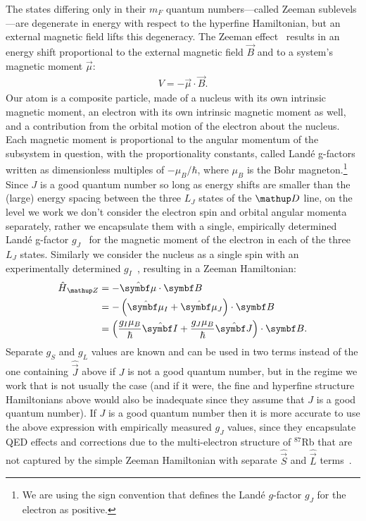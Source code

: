 The states differing only in their $m_F$ quantum numbers---called Zeeman sublevels---are degenerate in energy with respect to the hyperfine Hamiltonian, but an external magnetic field lifts this degeneracy. The Zeeman effect~\cite{zeeman_influence_1897, steck_rubidium_2015} results in an energy shift proportional to the external magnetic field $\vec B$ and to a system's magnetic moment $\vec \mu$:
\begin{align}
V = - \vec\mu\cdot\vec B.
\end{align}
Our atom is a composite particle, made of a nucleus with its own intrinsic magnetic moment, an electron with its own intrinsic magnetic moment as well, and a contribution from the orbital motion of the electron about the nucleus. Each magnetic moment is proportional to the angular momentum of the subsystem in question, with the proportionality constants, called Land\'e g-factors written as dimensionless multiples of $-\mu_B/\hbar$, where $\mu_B$ is the Bohr magneton.\footnote{We are using the sign convention that defines the Land\'e $g$-factor $g_J$ for the electron as positive.} Since $J$ is a good quantum number so long as energy shifts are smaller than the (large) energy spacing between the three $L_J$ states of the $\up{D}$ line, on the level we work we don't consider the electron spin and orbital angular momenta separately, rather we encapsulate them with a single, empirically determined Land\'e g-factor $g_J$~\cite{steck_rubidium_2015} for the magnetic moment of the electron in each of the three $L_J$ states. Similarly we consider the nucleus as a single spin with an experimentally determined $g_I$~\cite{steck_rubidium_2015}, resulting in a Zeeman Hamiltonian:
\begin{align}
\hat H_\up{Z} & = -\hat{\vec \mu} \cdot \vec B\\
&= -\left(\hat{\vec \mu}_I + \hat{\vec \mu}_J\right) \cdot \vec B\\
&=\left(\frac{g_I\mu_B}{\hbar} \hat{\vec I} + \frac{g_J\mu_B}{\hbar} \hat{\vec J}\right) \cdot \vec B.\label{eq:H_Z}
\end{align}
Separate $g_S$ and $g_L$ values are known and can be used in two terms instead of the one containing $\hat{\vec J}$ above if $J$ is not a good quantum number, but in the regime we work that is not usually the case (and if it were, the fine and hyperfine structure Hamiltonians above would also be inadequate since they assume that $J$ is a good quantum number). If $J$ is a good quantum number then it is more accurate to use the above expression with empirically measured $g_J$ values, since they encapsulate QED effects and corrections due to the multi-electron structure of $^{87}$Rb that are not captured by the simple Zeeman Hamiltonian with separate $\hat{\vec S}$ and $\hat{\vec L}$ terms~\cite{steck_rubidium_2015}. 

